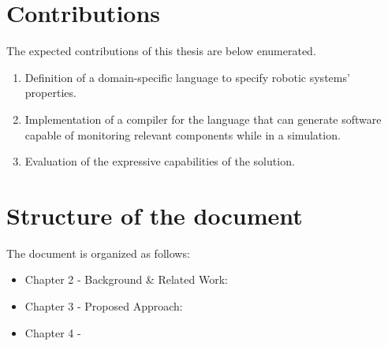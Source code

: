 \section{Contributions}
\label{sec:contributions}

The expected contributions of this thesis are below enumerated.

\begin{enumerate}
    \item Definition of a domain-specific language to specify robotic systems' properties.
    \item Implementation of a compiler for the language that can generate software capable of monitoring relevant components while in a simulation.
    \item Evaluation of the expressive capabilities of the solution.
\end{enumerate}

\section{Structure of the document}
\label{sec:structure}

The document is organized as follows:

\begin{itemize}
    \item Chapter 2 - Background \& Related Work:
    \item Chapter 3 - Proposed Approach:
    \item Chapter 4 -
\end{itemize}
